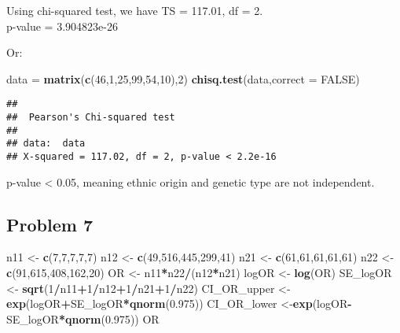 \documentclass[]{article}
\newenvironment{Shaded}{\begin{snugshade}}{\end{snugshade}}
\newcommand{\KeywordTok}[1]{\textcolor[rgb]{0.13,0.29,0.53}{\textbf{#1}}}
\newcommand{\DataTypeTok}[1]{\textcolor[rgb]{0.13,0.29,0.53}{#1}}
\newcommand{\DecValTok}[1]{\textcolor[rgb]{0.00,0.00,0.81}{#1}}
\newcommand{\FloatTok}[1]{\textcolor[rgb]{0.00,0.00,0.81}{#1}}
\newcommand{\StringTok}[1]{\textcolor[rgb]{0.31,0.60,0.02}{#1}}
\newcommand{\OtherTok}[1]{\textcolor[rgb]{0.56,0.35,0.01}{#1}}
\newcommand{\OperatorTok}[1]{\textcolor[rgb]{0.81,0.36,0.00}{\textbf{#1}}}
\newcommand{\NormalTok}[1]{#1}
\begin{document}
Using chi-squared test, we have TS = 117.01, df = 2.\\
p-value = 3.904823e-26

Or:

\begin{Shaded}
\begin{Highlighting}[]
\NormalTok{data =}\StringTok{ }\KeywordTok{matrix}\NormalTok{(}\KeywordTok{c}\NormalTok{(}\DecValTok{46}\NormalTok{,}\DecValTok{1}\NormalTok{,}\DecValTok{25}\NormalTok{,}\DecValTok{99}\NormalTok{,}\DecValTok{54}\NormalTok{,}\DecValTok{10}\NormalTok{),}\DecValTok{2}\NormalTok{)}
\KeywordTok{chisq.test}\NormalTok{(data,}\DataTypeTok{correct =} \OtherTok{FALSE}\NormalTok{)}
\end{Highlighting}
\end{Shaded}

\begin{verbatim}
## 
##  Pearson's Chi-squared test
## 
## data:  data
## X-squared = 117.02, df = 2, p-value < 2.2e-16
\end{verbatim}

p-value \textless{} 0.05, meaning ethnic origin and genetic type are not
independent.

\subsection{Problem 7}\label{problem-7}

\begin{Shaded}
\begin{Highlighting}[]
\NormalTok{n11 <-}\StringTok{ }\KeywordTok{c}\NormalTok{(}\DecValTok{7}\NormalTok{,}\DecValTok{7}\NormalTok{,}\DecValTok{7}\NormalTok{,}\DecValTok{7}\NormalTok{,}\DecValTok{7}\NormalTok{)}
\NormalTok{n12 <-}\StringTok{ }\KeywordTok{c}\NormalTok{(}\DecValTok{49}\NormalTok{,}\DecValTok{516}\NormalTok{,}\DecValTok{445}\NormalTok{,}\DecValTok{299}\NormalTok{,}\DecValTok{41}\NormalTok{)}
\NormalTok{n21 <-}\StringTok{ }\KeywordTok{c}\NormalTok{(}\DecValTok{61}\NormalTok{,}\DecValTok{61}\NormalTok{,}\DecValTok{61}\NormalTok{,}\DecValTok{61}\NormalTok{,}\DecValTok{61}\NormalTok{)}
\NormalTok{n22 <-}\StringTok{ }\KeywordTok{c}\NormalTok{(}\DecValTok{91}\NormalTok{,}\DecValTok{615}\NormalTok{,}\DecValTok{408}\NormalTok{,}\DecValTok{162}\NormalTok{,}\DecValTok{20}\NormalTok{)}
\NormalTok{OR <-}\StringTok{ }\NormalTok{n11}\OperatorTok{*}\NormalTok{n22}\OperatorTok{/}\NormalTok{(n12}\OperatorTok{*}\NormalTok{n21)}
\NormalTok{logOR <-}\StringTok{ }\KeywordTok{log}\NormalTok{(OR)}
\NormalTok{SE_logOR <-}\StringTok{ }\KeywordTok{sqrt}\NormalTok{(}\DecValTok{1}\OperatorTok{/}\NormalTok{n11}\OperatorTok{+}\DecValTok{1}\OperatorTok{/}\NormalTok{n12}\OperatorTok{+}\DecValTok{1}\OperatorTok{/}\NormalTok{n21}\OperatorTok{+}\DecValTok{1}\OperatorTok{/}\NormalTok{n22)}
\NormalTok{CI_OR_upper <-}\KeywordTok{exp}\NormalTok{(logOR}\OperatorTok{+}\NormalTok{SE_logOR}\OperatorTok{*}\KeywordTok{qnorm}\NormalTok{(}\FloatTok{0.975}\NormalTok{))}
\NormalTok{CI_OR_lower <-}\KeywordTok{exp}\NormalTok{(logOR}\OperatorTok{-}\NormalTok{SE_logOR}\OperatorTok{*}\KeywordTok{qnorm}\NormalTok{(}\FloatTok{0.975}\NormalTok{))}
\NormalTok{OR}
\end{Highlighting}
\end{Shaded}
\end{document}
